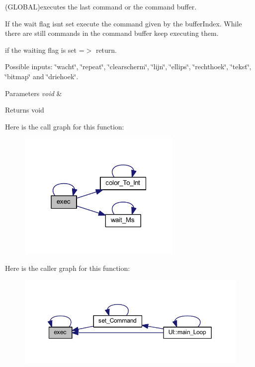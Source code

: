 (G\+L\+O\+B\+AL)executes the last command or the command buffer. 

If the wait flag isnt set execute the command given by the buffer\+Index. While there are still commands in the command buffer keep executing them.

if the waiting flag is set =$>$ return.

Possible inputs\+: \char`\"{}wacht\char`\"{}, \char`\"{}repeat\char`\"{}, \char`\"{}clearscherm\char`\"{}, \char`\"{}lijn\char`\"{}, \char`\"{}ellips\char`\"{}, \char`\"{}rechthoek\char`\"{}, \char`\"{}tekst\char`\"{}, \char`\"{}bitmap\char`\"{} and \char`\"{}driehoek\char`\"{}.


\begin{DoxyParams}{Parameters}
{\em void} & \\
\hline
\end{DoxyParams}
\begin{DoxyReturn}{Returns}
void 
\end{DoxyReturn}
Here is the call graph for this function\+:\nopagebreak
\begin{figure}[H]
\begin{center}
\leavevmode
\includegraphics[width=223pt]{namespace_l_l_ac98bc19f4e3468b76cfc2e43456527cc_cgraph}
\end{center}
\end{figure}
Here is the caller graph for this function\+:\nopagebreak
\begin{figure}[H]
\begin{center}
\leavevmode
\includegraphics[width=349pt]{namespace_l_l_ac98bc19f4e3468b76cfc2e43456527cc_icgraph}
\end{center}
\end{figure}
\mbox{\label{namespace_l_l_a201bbec5c7219ca80c90d31b0a31b482}} 

